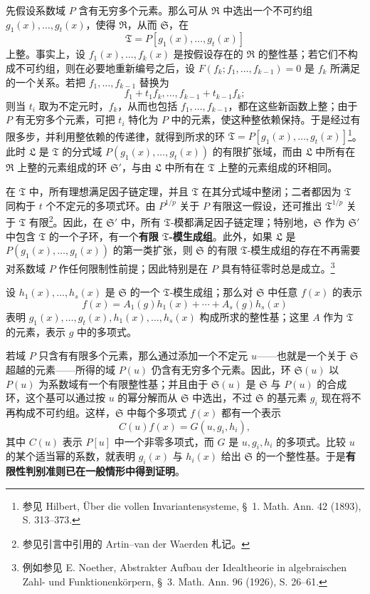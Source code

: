 \documentclass[11pt]{article}
\newcommand{\srcemph}[1]{\textbf{#1}}
\begin{document}
先假设系数域 $P$ 含有无穷多个元素。那么可从 $\mathfrak R$ 中选出一个不可约组 $g_1(x),\ldots,g_t(x)$，使得 $\mathfrak R$，从而 $\mathfrak S$，在
\[
 \mathfrak T=P[g_1(x),\ldots,g_t(x)]
\]
上整。事实上，设 $f_1(x),\ldots,f_k(x)$ 是按假设存在的 $\mathfrak R$ 的整性基；若它们不构成不可约组，则在必要地重新编号之后，设 $F(f_k;f_1,\ldots,f_{k-1})=0$ 是 $f_k$ 所满足的一个关系。若把 $f_1,\ldots,f_{k-1}$ 替换为
\[
 f_1+t_1f_k,\ldots,f_{k-1}+t_{k-1}f_k;
\]
则当 $t_i$ 取为不定元时，$f_k$，从而也包括 $f_1,\ldots,f_{k-1}$，都在这些新函数上整；由于 $P$ 有无穷多个元素，可把 $t_i$ 特化为 $P$ 中的元素，使这种整依赖保持。于是经过有限多步，并利用整依赖的传递律，就得到所求的环 $\mathfrak T=P[g_1(x),\ldots,g_t(x)]$\footnote{参见 Hilbert, Über die vollen Invariantensysteme, \S\ 1. Math. Ann. 42 (1893), S. 313--373.}。此时 $\mathfrak L$ 是 $\mathfrak T$ 的分式域 $P(g_1(x),\ldots,g_t(x))$ 的有限扩张域，而由 $\mathfrak L$ 中所有在 $\mathfrak R$ 上整的元素组成的环 $\mathfrak S'$，与由 $\mathfrak L$ 中所有在 $\mathfrak T$ 上整的元素组成的环相同。

在 $\mathfrak T$ 中，所有理想满足因子链定理，并且 $\mathfrak T$ 在其分式域中整闭；二者都因为 $\mathfrak T$ 同构于 $t$ 个不定元的多项式环。由 $P^{1/p}$ 关于 $P$ 有限这一假设，还可推出 $\mathfrak T^{1/p}$ 关于 $\mathfrak T$ 有限\footnote{参见引言中引用的 Artin--van der Waerden 札记。}。因此，在 $\mathfrak S'$ 中，所有 $\mathfrak T$-模都满足因子链定理；特别地，$\mathfrak S$ 作为 $\mathfrak S'$ 中包含 $\mathfrak T$ 的一个子环，有一个\srcemph{有限 $\mathfrak T$-模生成组}\footnotemark[\value{footnote}]。此外，如果 $\mathfrak L$ 是 $P(g_1(x),\ldots,g_t(x))$ 的第一类扩张，则 $\mathfrak S$ 的有限 $\mathfrak T$-模生成组的存在不再需要对系数域 $P$ 作任何限制性前提；因此特别是在 $P$ 具有特征零时总是成立。\footnote{例如参见 E. Noether, Abstrakter Aufbau der Idealtheorie in algebraischen Zahl- und Funktionenkörpern, \S\ 3. Math. Ann. 96 (1926), S. 26--61.}

设 $h_1(x),\ldots,h_s(x)$ 是 $\mathfrak S$ 的一个 $\mathfrak T$-模生成组；那么对 $\mathfrak S$ 中任意 $f(x)$ 的表示
\[
 f(x)=A_1(g)h_1(x)+\cdots+A_s(g)h_s(x)
\]
表明 $g_1(x),\ldots,g_t(x),h_1(x),\ldots,h_s(x)$ 构成所求的整性基；这里 $A$ 作为 $\mathfrak T$ 的元素，表示 $g$ 中的多项式。

若域 $P$ 只含有有限多个元素，那么通过添加一个不定元 $u$——也就是一个关于 $\mathfrak S$ 超越的元素——所得的域 $P(u)$ 仍含有无穷多个元素。因此，环 $\mathfrak S(u)$ 以 $P(u)$ 为系数域有一个有限整性基；并且由于 $\mathfrak S(u)$ 是 $\mathfrak S$ 与 $P(u)$ 的合成环，这个基可以通过按 $u$ 的幂分解而从 $\mathfrak S$ 中选出，不过 $\mathfrak S$ 的基元素 $g_i$ 现在将不再构成不可约组。这样，$\mathfrak S$ 中每个多项式 $f(x)$ 都有一个表示
\[
 C(u)f(x)=G(u,g_i,h_i),
\]
其中 $C(u)$ 表示 $P[u]$ 中一个非零多项式，而 $G$ 是 $u,g_i,h_i$ 的多项式。比较 $u$ 的某个适当幂的系数，就表明 $g_i(x)$ 与 $h_i(x)$ 给出 $\mathfrak S$ 的一个整性基。于是\srcemph{有限性判别准则已在一般情形中得到证明}。
\end{document}
